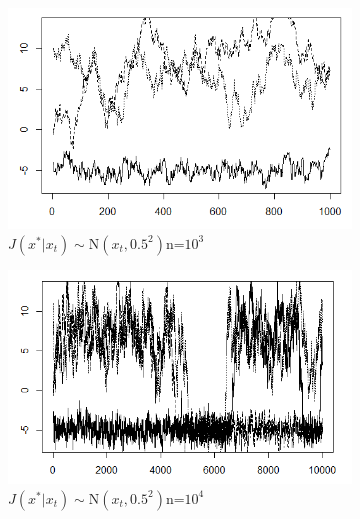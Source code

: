 \documentclass[11pt]{amsart}
\theoremstyle{theorem} %
\theoremstyle{definition}                  %
\theoremstyle{example}                       %
\theoremstyle{remark}                       %
\numberwithin{equation}{section}
\begin{document}
    \begin{figure}
        \centering
        \begin{subfigure}[b]{0.475\textwidth}
            \centering
            \includegraphics[width=\textwidth]{mixtrace.png}
            \caption{$J(x^*|x_t)\sim \text{N}(x_t, 0.5^2)$\newline n=$10^3$}    
            \label{fig:mixtrace}
        \end{subfigure}
        \hfill
        \begin{subfigure}[b]{0.475\textwidth}  
            \centering 
            \includegraphics[width=\textwidth]{longmixture.png}
            \caption{$J(x^*|x_t)\sim \text{N}(x_t, 0.5^2)$\newline n=$10^4$}    
            \label{fig:mixlong}
        \end{subfigure}
        \begin{subfigure}[b]{0.475\textwidth}   
            \centering 

\end{subfigure}
\end{figure}
\end{document}
